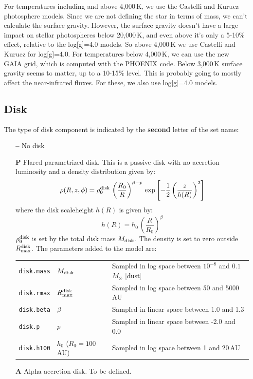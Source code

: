 \documentclass[10pt]{article}
\newcommand{\mdisk}{M_{\rm disk}}
\newcommand{\msun}{M_\odot}
\newcommand{\rmaxd}{R^{\rm disk}_{\rm max}}
\begin{document}
\begin{itemize}
For temperatures including and above 4,000\,K, we use the Castelli and Kurucz photosphere models. Since we are not defining the star in terms of mass, we can't calculate the surface gravity. However, the surface gravity doesn't have a large impact on stellar photospheres below 20,000\,K, and even above it's only a 5-10\% effect, relative to the log[g]=4.0 models. So above 4,000\,K we use Castelli and Kurucz for log[g]=4.0. For temperatures below 4,000\,K, we can use the new GAIA grid, which is computed with the PHOENIX code. Below 3,000\,K surface gravity seems to matter, up to a 10-15\% level. This is probably going to mostly affect the near-infrared fluxes. For these, we also use log[g]=4.0 models.

\end{itemize}
         
\subsection{Disk}

The type of disk component is indicated by the \textbf{second} letter of the set name:

\begin{itemize}

\item[\textbf{--}] No disk

\item[\textbf{P}] Flared parametrized disk. This is a passive disk with no accretion luminosity and a density distribution given by:
$$
\rho(R,z,\phi) = \rho_0^{\rm disk}\,\left(\frac{R_0}{R}\right)^{\beta - p}\,\exp{\left[-\frac{1}{2}\left(\frac{z}{h(R)}\right)^2\right]}
$$
where the disk scaleheight $h(R)$ is given by:
$$
h(R) = h_0\,\left(\frac{R}{R_0}\right)^\beta
$$
$\rho_0^{\rm disk}$ is set by the total disk mass $M_{\rm disk}$. The density is set to zero outside $\rmaxd$. The parameters added to the model are:

\begin{center}
  \begin{tabular}{llp{4in}}
    \texttt{disk.mass} & $\mdisk$ & Sampled in log space between $10^{-8}$ and $0.1$\,$\msun$ [dust] \\
    \texttt{disk.rmax} & $\rmaxd$ & Sampled in log space between 50 and 5000\,AU \\
    \texttt{disk.beta} & $\beta$ & Sampled in linear space between 1.0 and 1.3 \\
    \texttt{disk.p} & $p$ & Sampled in linear space between -2.0 and 0.0 \\
    \texttt{disk.h100} & $h_0$ ($R_0=100$\,AU) & Sampled in log space between 1 and 20\,AU \\
  \end{tabular}
\end{center}

\item[\textbf{A}] Alpha accretion disk. To be defined.

\end{itemize}
\end{document}
